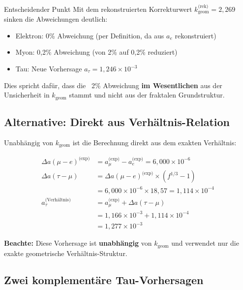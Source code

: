 	\begin{important}{Entscheidender Punkt}
		Mit dem rekonstruierten Korrekturwert $k_{\text{geom}}^{\text{(rek)}} = 2{,}269$ sinken die Abweichungen deutlich:
		\begin{itemize}
			\item Elektron: 0\% Abweichung (per Definition, da aus $a_e$ rekonstruiert)
			\item Myon: 0{,}2\% Abweichung (von 2\% auf 0{,}2\% reduziert)
			\item Tau: Neue Vorhersage $a_\tau = 1{,}246 \times 10^{-3}$
		\end{itemize}
		
		Dies spricht dafür, dass die ~2\% Abweichung \textbf{im Wesentlichen} aus der Unsicherheit in $k_{\text{geom}}$ stammt und nicht aus der fraktalen Grundstruktur.
	\end{important}
	
	\subsection{Alternative: Direkt aus Verhältnis-Relation}
	
	Unabhängig von $k_{\text{geom}}$ ist die Berechnung direkt aus dem exakten Verhältnis:
	
	\begin{align}
		\Delta a(\mu-e)^{\text{(exp)}} &= a_\mu^{\text{(exp)}} - a_e^{\text{(exp)}} = 6{,}000 \times 10^{-6} \\
		\Delta a(\tau-\mu) &= \Delta a(\mu-e)^{\text{(exp)}} \times (f^{1/3} - 1) \\
		&= 6{,}000 \times 10^{-6} \times 18{,}57 = 1{,}114 \times 10^{-4} \\
		a_\tau^{\text{(Verhältnis)}} &= a_\mu^{\text{(exp)}} + \Delta a(\tau-\mu) \\
		&= 1{,}166 \times 10^{-3} + 1{,}114 \times 10^{-4} \\
		&= \boxed{1{,}277 \times 10^{-3}}
	\end{align}
	
	\textbf{Beachte:} Diese Vorhersage ist \textbf{unabhängig} von $k_{\text{geom}}$ und verwendet nur die exakte geometrische Verhältnis-Struktur.
	
	\subsection{Zwei komplementäre Tau-Vorhersagen}
	

